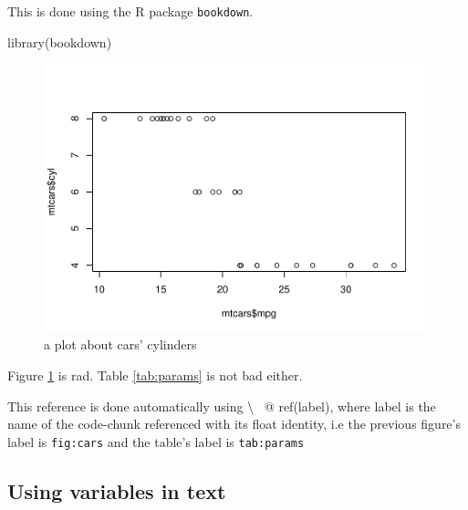 \documentclass[
  11pt,
]{article}
\newenvironment{Shaded}{\begin{snugshade}}{\end{snugshade}}
\newcommand{\FunctionTok}[1]{\textcolor[rgb]{0.00,0.00,0.00}{#1}}
\newcommand{\NormalTok}[1]{#1}
\newcommand{\SpecialCharTok}[1]{\textcolor[rgb]{0.00,0.00,0.00}{#1}}
\begin{document}
This is done using the R package \texttt{bookdown}.

\begin{Shaded}
\begin{Highlighting}[]
\FunctionTok{library}\NormalTok{(bookdown)}
\end{Highlighting}
\end{Shaded}

\begin{Shaded}
\end{Shaded}

\begin{figure}
\centering
\includegraphics{syntax_files/figure-latex/cars-1.pdf}
\caption{\label{fig:cars}a plot about cars' cylinders}
\end{figure}

Figure \ref{fig:cars} is rad. Table \ref{tab:params} is not bad either.

This reference is done automatically using \textbackslash{} ~@ ref(label), where label is the name of the code-chunk referenced with its float identity, i.e the previous figure's label is \texttt{fig:cars} and the table's label is \texttt{tab:params}

\hypertarget{using-variables-in-text}{%
\subsection{Using variables in text}\label{using-variables-in-text}}
\end{document}
